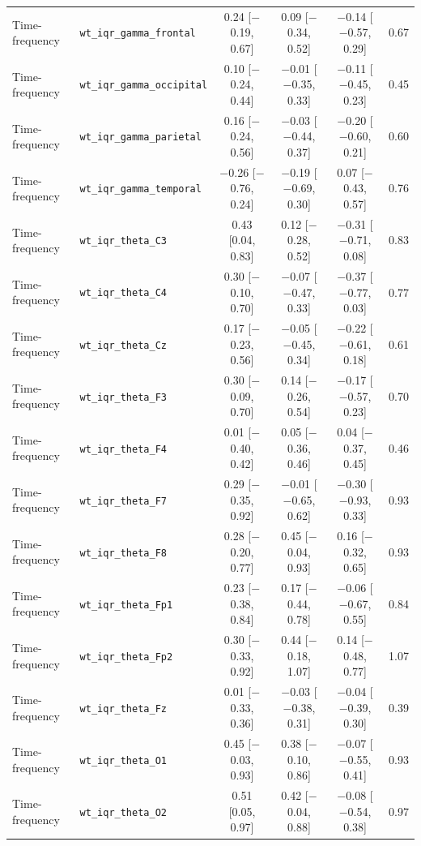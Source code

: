 {\begin{longtable}{llcccc}
Time-frequency & \texttt{wt\_iqr\_gamma\_frontal} & 0.24 [$-$0.19, 0.67] & 0.09 [$-$0.34, 0.52] & $-$0.14 [$-$0.57, 0.29] & 0.67 \\
Time-frequency & \texttt{wt\_iqr\_gamma\_occipital} & 0.10 [$-$0.24, 0.44] & $-$0.01 [$-$0.35, 0.33] & $-$0.11 [$-$0.45, 0.23] & 0.45 \\
Time-frequency & \texttt{wt\_iqr\_gamma\_parietal} & 0.16 [$-$0.24, 0.56] & $-$0.03 [$-$0.44, 0.37] & $-$0.20 [$-$0.60, 0.21] & 0.60 \\
Time-frequency & \texttt{wt\_iqr\_gamma\_temporal} & $-$0.26 [$-$0.76, 0.24] & $-$0.19 [$-$0.69, 0.30] & 0.07 [$-$0.43, 0.57] & 0.76 \\
Time-frequency & \texttt{wt\_iqr\_theta\_C3} & 0.43 [0.04, 0.83] & 0.12 [$-$0.28, 0.52] & $-$0.31 [$-$0.71, 0.08] & 0.83 \\
Time-frequency & \texttt{wt\_iqr\_theta\_C4} & 0.30 [$-$0.10, 0.70] & $-$0.07 [$-$0.47, 0.33] & $-$0.37 [$-$0.77, 0.03] & 0.77 \\
Time-frequency & \texttt{wt\_iqr\_theta\_Cz} & 0.17 [$-$0.23, 0.56] & $-$0.05 [$-$0.45, 0.34] & $-$0.22 [$-$0.61, 0.18] & 0.61 \\
Time-frequency & \texttt{wt\_iqr\_theta\_F3} & 0.30 [$-$0.09, 0.70] & 0.14 [$-$0.26, 0.54] & $-$0.17 [$-$0.57, 0.23] & 0.70 \\
Time-frequency & \texttt{wt\_iqr\_theta\_F4} & 0.01 [$-$0.40, 0.42] & 0.05 [$-$0.36, 0.46] & 0.04 [$-$0.37, 0.45] & 0.46 \\
Time-frequency & \texttt{wt\_iqr\_theta\_F7} & 0.29 [$-$0.35, 0.92] & $-$0.01 [$-$0.65, 0.62] & $-$0.30 [$-$0.93, 0.33] & 0.93 \\
Time-frequency & \texttt{wt\_iqr\_theta\_F8} & 0.28 [$-$0.20, 0.77] & 0.45 [$-$0.04, 0.93] & 0.16 [$-$0.32, 0.65] & 0.93 \\
Time-frequency & \texttt{wt\_iqr\_theta\_Fp1} & 0.23 [$-$0.38, 0.84] & 0.17 [$-$0.44, 0.78] & $-$0.06 [$-$0.67, 0.55] & 0.84 \\
Time-frequency & \texttt{wt\_iqr\_theta\_Fp2} & 0.30 [$-$0.33, 0.92] & 0.44 [$-$0.18, 1.07] & 0.14 [$-$0.48, 0.77] & 1.07 \\
Time-frequency & \texttt{wt\_iqr\_theta\_Fz} & 0.01 [$-$0.33, 0.36] & $-$0.03 [$-$0.38, 0.31] & $-$0.04 [$-$0.39, 0.30] & 0.39 \\
Time-frequency & \texttt{wt\_iqr\_theta\_O1} & 0.45 [$-$0.03, 0.93] & 0.38 [$-$0.10, 0.86] & $-$0.07 [$-$0.55, 0.41] & 0.93 \\
Time-frequency & \texttt{wt\_iqr\_theta\_O2} & 0.51 [0.05, 0.97] & 0.42 [$-$0.04, 0.88] & $-$0.08 [$-$0.54, 0.38] & 0.97 \\

\end{longtable}}
